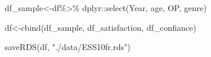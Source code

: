 \documentclass[
]{book}
\newenvironment{Shaded}{\begin{snugshade}}{\end{snugshade}}
\newcommand{\FunctionTok}[1]{\textcolor[rgb]{0.00,0.00,0.00}{#1}}
\newcommand{\NormalTok}[1]{#1}
\newcommand{\OtherTok}[1]{\textcolor[rgb]{0.56,0.35,0.01}{#1}}
\newcommand{\SpecialCharTok}[1]{\textcolor[rgb]{0.00,0.00,0.00}{#1}}
\newcommand{\StringTok}[1]{\textcolor[rgb]{0.31,0.60,0.02}{#1}}
\begin{document}
\begin{Shaded}
\begin{Highlighting}[]
\NormalTok{df\_sample}\OtherTok{\textless{}{-}}\NormalTok{df}\SpecialCharTok{\%\textgreater{}\%}
\NormalTok{  dplyr}\SpecialCharTok{::}\FunctionTok{select}\NormalTok{(Year, age, OP, genre)}


\NormalTok{df}\OtherTok{\textless{}{-}}\FunctionTok{cbind}\NormalTok{(df\_sample, df\_satisfaction, df\_confiance)}

\FunctionTok{saveRDS}\NormalTok{(df, }\StringTok{"./data/ESS10fr.rds"}\NormalTok{)}
\end{Highlighting}
\end{Shaded}


  
\end{document}
